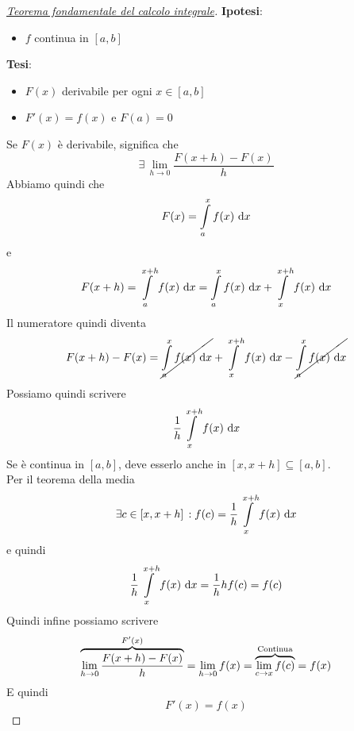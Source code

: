      \begin{proof}
        [\protect\hyperlink{teor:tfci}{Teorema fondamentale del calcolo integrale}]
        \textbf{Ipotesi}:
        \begin{itemize}
          \item $f$ continua in $[a,b]$
        \end{itemize}
        \textbf{Tesi}:
        \begin{itemize}
          \item $F(x)$ derivabile per ogni $x\in[a,b]$
          \item $F'(x)=f(x)$ e $F(a)=0$
        \end{itemize}
        \divisor

        Se $F(x)$ è derivabile, significa che
        \begin{equation*}
          \exists\,\lim\limits_{h\to0} \frac{F(x+h)-F(x)}{h}
        \end{equation*}
        Abbiamo quindi che
        \begin{equation*}
          F(x) = \int\limits_{a}^{x} f(x)\,\mathop{}\!\mathrm{d} x
        \end{equation*}
        e
        \begin{equation*}
          F(x+h) = \int\limits_{a}^{x+h} f(x)\,\mathop{}\!\mathrm{d} x = \int\limits_{a}^{x} f(x)\,\mathop{}\!\mathrm{d} x + 
          \int\limits_{x}^{x+h} f(x)\,\mathop{}\!\mathrm{d} x
        \end{equation*}
        Il numeratore quindi diventa
        \begin{equation*}
          F(x+h)-F(x) = \cancel{\int\limits_{a}^{x} f(x)\,\mathop{}\!\mathrm{d} x}+\int\limits_{x}^{x+h} f(x)\,\mathop{}\!\mathrm{d} x
          -\cancel{\int\limits_{a}^{x} f(x)\,\mathop{}\!\mathrm{d} x}
        \end{equation*}
        Possiamo quindi scrivere
        \begin{equation*}
          \frac{1}{h}\int\limits_{x}^{x+h} f(x)\,\mathop{}\!\mathrm{d} x
        \end{equation*}
        Se è continua in $[a,b]$, deve esserlo anche in $[x,x+h]\subseteq[a,b]$.\\
        Per il teorema della media
        \begin{equation*}
          \exists c\in[x,x+h]\,: f(c)=\frac{1}{h}\int\limits_{x}^{x+h} f(x)\,\mathop{}\!\mathrm{d} x
        \end{equation*}
        e quindi
        \begin{equation*}
          \frac{1}{h}\int\limits_{x}^{x+h} f(x)\,\mathop{}\!\mathrm{d} x=\frac{1}{h}h f(c) = f(c)
        \end{equation*}
        Quindi infine possiamo scrivere
        \begin{equation*}
          \overbrace{\lim\limits_{h\to0} \frac{F(x+h)-F(x)}{h}}^{\mathclap{F'(x)}}=
          \lim\limits_{h\to0}f(x)=\overbrace{\lim\limits_{c\to x}f(c)}^{\mathclap{\text{Continua}}}=f(x)
        \end{equation*}
        E quindi
        \begin{equation*}
          F'(x) = f(x)
        \end{equation*}
      \end{proof}
